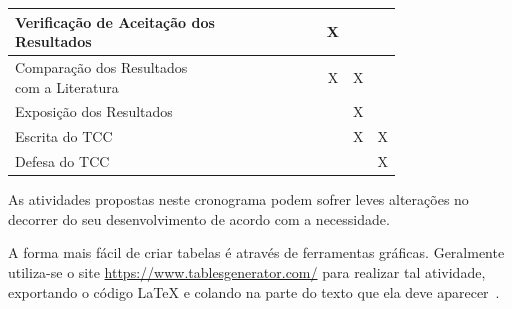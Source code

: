 \begin{table}[!htb]
\begin{tabular}{|l|c|c|c|c|c|c|c|c|c|c|}
\makecell[l]{Verificação de Aceitação dos \\ Resultados}    &              &              &              &              &              &                &                   & X             &              &              \\ \hline
\makecell[l]{Comparação dos Resultados \\ com a Literatura} &              &              &              &              &              &                &                   & X             & X            &              \\ \hline
Exposição dos Resultados                   &              &              &              &              &              &                &                   &               & X            &              \\ \hline
Escrita do TCC                             &              &              &              &              &              &                &                   &               & X            & X            \\ \hline
Defesa do TCC                              &              &              &              &              &              &                &                   &               &              & X            \\ \hline
\end{tabular}
\vspace{6pt}
\end{table}

As atividades propostas neste cronograma podem sofrer leves alterações no decorrer do seu desenvolvimento de acordo com a necessidade.

A forma mais fácil de criar tabelas é através de ferramentas gráficas. Geralmente utiliza-se o site \url{https://www.tablesgenerator.com/} para realizar tal atividade, exportando o código LaTeX e colando na parte do texto que ela deve aparecer~\cite{tablegenerator2021}.